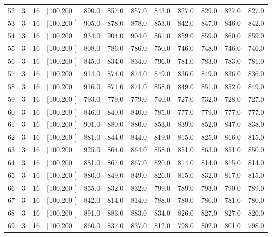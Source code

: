\documentclass[12pt,a4paper]{article}
\begin{document}
\begin{center}
{\begin{tabular}{r r r r r r r r r r r r}
  52&  3& 16&[100.200   ]&   890.0&   857.0&   857.0&   843.0&   827.0&   829.0&   827.0&   827.0\\[-0.02in]
  53&  3& 16&[100.200   ]&   905.0&   878.0&   878.0&   853.0&   842.0&   847.0&   846.0&   842.0\\[-0.02in]
  54&  3& 16&[100.200   ]&   934.0&   904.0&   904.0&   861.0&   859.0&   859.0&   860.0&   859.0\\[-0.02in]
  55&  3& 16&[100.200   ]&   808.0&   786.0&   786.0&   750.0&   746.0&   748.0&   746.0&   746.0\\[-0.02in]
  56&  3& 16&[100.200   ]&   845.0&   834.0&   834.0&   796.0&   781.0&   783.0&   783.0&   781.0\\[-0.02in]
  57&  3& 16&[100.200   ]&   914.0&   874.0&   874.0&   849.0&   836.0&   849.0&   836.0&   836.0\\[-0.02in]
  58&  3& 16&[100.200   ]&   916.0&   871.0&   871.0&   858.0&   849.0&   851.0&   852.0&   849.0\\[-0.02in]
  59&  3& 16&[100.200   ]&   793.0&   779.0&   779.0&   740.0&   727.0&   732.0&   728.0&   727.0\\[-0.02in]
  60&  3& 16&[100.200   ]&   846.0&   840.0&   840.0&   785.0&   777.0&   779.0&   777.0&   777.0\\[-0.02in]
  61&  3& 16&[100.200   ]&   901.0&   880.0&   880.0&   853.0&   839.0&   852.0&   847.0&   838.0\\[-0.02in]
  62&  3& 16&[100.200   ]&   881.0&   844.0&   844.0&   819.0&   815.0&   825.0&   816.0&   815.0\\[-0.02in]
  63&  3& 16&[100.200   ]&   925.0&   864.0&   864.0&   858.0&   851.0&   863.0&   851.0&   850.0\\[-0.02in]
  64&  3& 16&[100.200   ]&   881.0&   867.0&   867.0&   820.0&   814.0&   814.0&   815.0&   814.0\\[-0.02in]
  65&  3& 16&[100.200   ]&   880.0&   849.0&   849.0&   826.0&   815.0&   832.0&   817.0&   815.0\\[-0.02in]
  66&  3& 16&[100.200   ]&   855.0&   832.0&   832.0&   799.0&   789.0&   793.0&   790.0&   789.0\\[-0.02in]
  67&  3& 16&[100.200   ]&   842.0&   814.0&   814.0&   788.0&   780.0&   780.0&   781.0&   780.0\\[-0.02in]
  68&  3& 16&[100.200   ]&   891.0&   883.0&   883.0&   834.0&   826.0&   827.0&   827.0&   826.0\\[-0.02in]
  69&  3& 16&[100.200   ]&   860.0&   837.0&   837.0&   812.0&   798.0&   802.0&   801.0&   798.0\\[-0.02in]

\end{tabular}}
\end{center}
\end{document}
